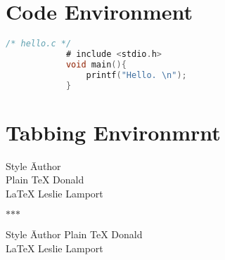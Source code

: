 \documentclass{article}
\begin{document}
    \section{Code Environment}
        \lstset{
            numbers=left,
            numberstyle=\footnotesize,
            basicstyle=\sffamily,
            keywordstyle=\bfseries,
            commentstyle=\rmfamily\itshape,
            stringstyle=\ttfamily
        }                                               %
        \begin{lstlisting}[language=C]
            /* hello.c */
            # include <stdio.h>
            void main(){
                printf("Hello. \n"); 
            }
        \end{lstlisting}
        {
            \lstset{language=C}
        }

    \section{Tabbing Environmrnt}
        \begin{tabbing}
            Style\hspace{3em} \= Author \\
            Plain \TeX \> Donald \\
            LaTeX \> Leslie Lamport
        \end{tabbing}
        
        \noindent\hfill$*$\hfill$*$\hfill$*$\hfill

        \begin{tabbing}
            Style\hspace{3em} \= Author \kill
            Plain \TeX \> Donald \\
            LaTeX \> Leslie Lamport
        \end{tabbing}
\end{document}
